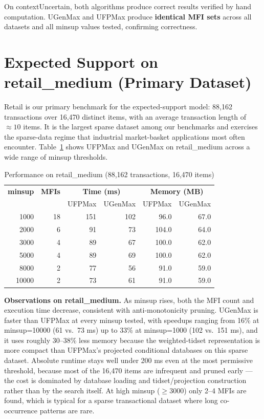 \documentclass[12pt,a4paper]{report}
\begin{document}
  On contextUncertain, both algorithms produce correct results verified by hand computation. UGenMax and UFPMax produce \textbf{identical MFI sets} across all datasets and all minsup values tested, confirming correctness.

  \section{Expected Support on retail\_medium (Primary Dataset)}

  Retail is our primary benchmark for the expected-support model: 88,162 transactions over 16,470 distinct items, with an average transaction length of $\approx 10$ items. It is the largest sparse dataset among our benchmarks and exercises the sparse-data regime that industrial market-basket applications most often encounter. Table~\ref{tab:retail_minsup} shows UFPMax and UGenMax on retail\_medium across a wide range of minsup thresholds.

  \begin{table}[h]
    \centering
    \caption{Performance on retail\_medium (88,162 transactions, 16,470 items)}
    \label{tab:retail_minsup}
    \begin{tabular}{rrrrrr}
      \toprule
      \textbf{minsup} & \textbf{MFIs} & \multicolumn{2}{c}{\textbf{Time (ms)}} & \multicolumn{2}{c}{\textbf{Memory (MB)}} \\
      & & UFPMax & UGenMax & UFPMax & UGenMax \\
      \midrule
      1000 & 18 & 151 & 102 & 96.0 & 67.0 \\
      2000 & 6 & 91 & 73 & 104.0 & 64.0 \\
      3000 & 4 & 89 & 67 & 100.0 & 62.0 \\
      5000 & 4 & 89 & 69 & 100.0 & 62.0 \\
      8000 & 2 & 77 & 56 & 91.0 & 59.0 \\
      10000 & 2 & 73 & 61 & 91.0 & 59.0 \\
      \bottomrule
    \end{tabular}
  \end{table}

  \textbf{Observations on retail\_medium.} As minsup rises, both the MFI count and execution time decrease, consistent with anti-monotonicity pruning. UGenMax is faster than UFPMax at every minsup tested, with speedups ranging from 16\% at minsup=10000 (61 vs.\ 73 ms) up to 33\% at minsup=1000 (102 vs.\ 151 ms), and it uses roughly 30--38\% less memory because the weighted-tidset representation is more compact than UFPMax's projected conditional databases on this sparse dataset. Absolute runtime stays well under 200 ms even at the most permissive threshold, because most of the 16,470 items are infrequent and pruned early --- the cost is dominated by database loading and tidset/projection construction rather than by the search itself. At high minsup ($\geq 3000$) only 2--4 MFIs are found, which is typical for a sparse transactional dataset where long co-occurrence patterns are rare.
\end{document}
